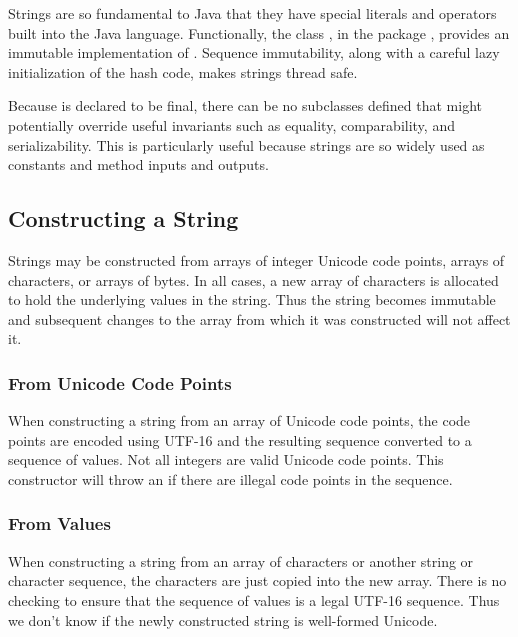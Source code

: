 Strings are so fundamental to Java that they have special literals and
operators built into the Java language.  Functionally, the class
, in the package , provides an immutable
implementation of .  Sequence immutability, along
with a careful lazy initialization of the hash code, makes strings
thread safe.

Because  is declared to be final, there can be no
subclasses defined that might potentially override useful invariants
such as equality, comparability, and serializability.  This is
particularly useful because strings are so widely used as constants
and method inputs and outputs.

\subsection{Constructing a String}

Strings may be constructed from arrays of integer Unicode code points,
arrays of characters, or arrays of bytes.  In all cases, a new array
of characters is allocated to hold the underlying  values
in the string.  Thus the string becomes immutable and subsequent
changes to the array from which it was constructed will not affect it.

\subsubsection{From Unicode Code Points}

When constructing a string from an array of Unicode code points, the
code points are encoded using UTF-16 and the resulting sequence
converted to a sequence of  values.  Not all integers are
valid Unicode code points.  This constructor will throw an
 if there are illegal code points in
the sequence.

\subsubsection{From  Values}\label{section:string-construct-chars}

When constructing a string from an array of characters or another
string or character sequence, the characters are just copied into the
new array.  There is no checking to ensure that the sequence of
 values is a legal UTF-16 sequence.  Thus we don't know if
the newly constructed string is well-formed Unicode.

